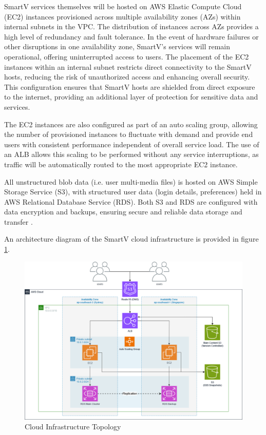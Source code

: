 SmartV services themselves will be hosted on AWS Elastic Compute Cloud (EC2) instances provisioned across multiple availability zones (AZs) within internal subnets in the VPC. The distribution of instances across AZs provides a high level of redundancy and fault tolerance. In the event of hardware failures or other disruptions in one availability zone, SmartV's services will remain operational, offering uninterrupted access to users. The placement of the EC2 instances within an internal subnet restricts direct connectivity to the SmartV hosts, reducing the risk of unauthorized access and enhancing overall security. This configuration ensures that SmartV hosts are shielded from direct exposure to the internet, providing an additional layer of protection for sensitive data and services.

The EC2 instances are also configured as part of an auto scaling group, allowing the number of provisioned instances to fluctuate with demand and provide end users with consistent performance independent of overall service load. The use of an ALB allows this scaling to be performed without any service interruptions, as traffic will be automatically routed to the most appropriate EC2 instance.


All unstructured blob data (i.e. user multi-media files) is hosted on AWS Simple Storage Service (S3), with structured user data (login details, preferences) held in AWS Relational Database Service (RDS). Both S3 and RDS are configured with data encryption and backups, ensuring secure and reliable data storage and transfer \parencite{amazonwebservicesEncryptingAmazonRDS2023, amazonwebservicesProtectingDataEncryption}.

An architecture diagram of the SmartV cloud infrastructure is provided in figure \ref{fig:awsdiagram}.

\begin{figure}[h]\label{fig:awsdiagram}
    \centering
    \includegraphics[width=\textwidth]{cci_aws}
    \caption{Cloud Infrastructure Topology}
\end{figure}


